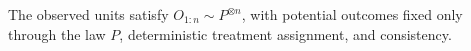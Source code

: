 The observed units satisfy \(O_{1:n}\sim P^{\otimes n}\), with potential outcomes fixed only through the law \(P\), deterministic treatment assignment, and consistency.